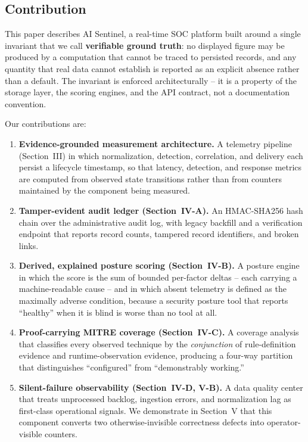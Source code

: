 \documentclass[conference]{IEEEtran}
\begin{document}
\subsection{Contribution}

This paper describes AI Sentinel, a real-time SOC platform built around a
single invariant that we call \textbf{verifiable ground truth}: no displayed
figure may be produced by a computation that cannot be traced to persisted
records, and any quantity that real data cannot establish is reported as an
explicit absence rather than a default. The invariant is enforced
architecturally -- it is a property of the storage layer, the scoring
engines, and the API contract, not a documentation convention.

Our contributions are:

\begin{enumerate}
\item \textbf{Evidence-grounded measurement architecture.} A telemetry
      pipeline (Section~III) in which normalization, detection, correlation,
      and delivery each persist a lifecycle timestamp, so that latency,
      detection, and response metrics are computed from observed
      state transitions rather than from counters maintained by the
      component being measured.

\item \textbf{Tamper-evident audit ledger (Section~IV-A).} An HMAC-SHA256
      hash chain over the administrative audit log, with legacy backfill and
      a verification endpoint that reports record counts, tampered record
      identifiers, and broken links.

\item \textbf{Derived, explained posture scoring (Section~IV-B).} A posture
      engine in which the score is the sum of bounded per-factor deltas --
      each carrying a machine-readable cause -- and in which absent
      telemetry is defined as the maximally adverse condition, because a
      security posture tool that reports ``healthy'' when it is blind is
      worse than no tool at all.

\item \textbf{Proof-carrying MITRE coverage (Section~IV-C).} A coverage
      analysis that classifies every observed technique by the
      \emph{conjunction} of rule-definition evidence and runtime-observation
      evidence, producing a four-way partition that distinguishes
      ``configured'' from ``demonstrably working.''

\item \textbf{Silent-failure observability (Section~IV-D, V-B).} A data
      quality center that treats unprocessed backlog, ingestion errors, and
      normalization lag as first-class operational signals. We demonstrate
      in Section~V that this component converts two otherwise-invisible
      correctness defects into operator-visible counters.
\end{enumerate}
\end{document}
